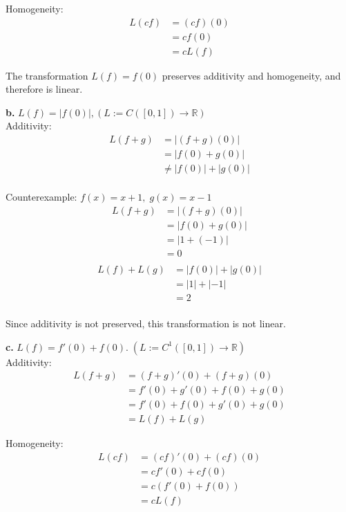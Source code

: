 \documentclass{article}
\begin{document}
\noindent Homogeneity:
\begin{align*}
    L(cf) &= (cf)(0) \\
    &= cf(0) \\
    &= cL(f)
\end{align*}

\noindent The transformation $L(f) = f(0)$ preserves additivity and homogeneity, and therefore is linear.

\vspace{0.25cm}
\noindent\textbf{b.} $ L(f) = |f(0)|, (L := C([0,1]) \to \mathbb{R}) $ \\
Additivity:
\begin{align*}
    L(f + g) &= |(f + g)(0)| \\
    &= |f(0) + g(0)| \\
    &\neq |f(0)| + |g(0)| \\
\end{align*}

Counterexample: $f(x) = x + 1, \; g(x) = x - 1$
\begin{align*}
    L(f + g) &= |(f + g)(0)| \\
    &= |f(0) + g(0)| \\
    &= |1 + (-1)| \\
    &= 0 \\
\end{align*}
\begin{align*}
    L(f) + L(g) &= |f(0)| + |g(0)| \\
    &= |1| + |-1| \\
    &= 2 \\
\end{align*}

Since additivity is not preserved, this transformation is not linear.

\vspace{0.25cm}
\noindent\textbf{c.} $ L(f) = f'(0) + f(0). \; (L := C^1([0,1]) \to \mathbb{R}) $ \\
Additivity:
\begin{align*}
    L(f + g) &= (f + g)'(0) + (f + g)(0) \\
    &= f'(0) + g'(0) + f(0) + g(0) \\
    &= f'(0) + f(0) + g'(0) + g(0) \\
    &= L(f) + L(g)
\end{align*}

\noindent Homogeneity:
\begin{align*}
    L(cf) &= (cf)'(0) + (cf)(0) \\
    &= cf'(0) + cf(0) \\
    &= c(f'(0) + f(0)) \\
    &= cL(f)
\end{align*}
\end{document}
